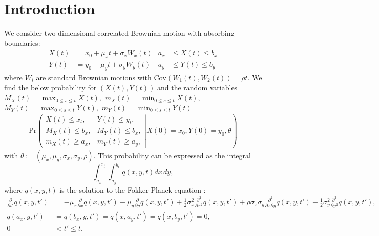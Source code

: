 \label{ch:galerkin}

\section{Introduction}

We consider two-dimensional correlated Brownian motion with absorbing boundaries:
\begin{align}
  X(t) &= x_0 + \mu_x t + \sigma_x W_x(t) &a_x &\leq X(t) \leq b_x   \label{eq:X} \\
  Y(t) &= y_0 + \mu_y t + \sigma_y W_y(t) &a_y &\leq Y(t) \leq b_y   \label{eq:Y} 
\end{align}
where $W_i$ are standard Brownian motions with
$\mbox{Cov}(W_1(t), W_2(t)) = \rho t$. We find the below probability
for $(X(t), Y(t))$ and the random variables
$M_X(t)=\max_{0\leq s\leq t}X(t),$ $m_X(t)=\min_{0\leq s\leq t}X(t),$
$M_Y(t)=\max_{0\leq s\leq t}Y(t),$ $m_Y(t)=\min_{0\leq s\leq t}Y(t)$
\begin{align}
  \mbox{Pr}\left( \left. \begin{array}{ll}
                           X(t) \leq x_t, & Y(t) \leq y_t, \\
                           M_X(t) \leq b_x, & M_Y(t) \leq b_x, \\
                           m_X(t) \geq a_x, & m_Y(t) \geq a_y,
                         \end{array} \right| X(0) = x_0, Y(0) = y_0, \theta \right)
                                              \label{eq:CDF}
\end{align}
with $\theta := (\mu_x, \mu_y, \sigma_x, \sigma_y, \rho).$ This
probability can be expressed as the integral
\[
  \displaystyle \int_{a_x}^{x_t} \displaystyle \int_{a_y}^{y_t} q(x,y,t) dx\,dy,
\]
where $q(x,y,t)$ is the solution to the Fokker-Planck equation
\cite{oksendal2013stochastic}:
\begin{align}
  \displaystyle \frac{\partial}{\partial t'} q(x,y,t') &= -\mu_x \frac{\partial}{\partial x}q(x,y,t')
                                         - \mu_y \frac{\partial}{\partial y}q(x,y,t')
                                         + \frac{1}{2}\sigma_x^2 \frac{\partial^2}{\partial x^2}q(x,y,t')
                                         + \rho\sigma_x\sigma_y \frac{\partial^2}{\partial x \partial y}q(x,y,t')
                                         + \frac{1}{2}\sigma_y^2 \frac{\partial^2}{\partial y^2}q(x,y,t'),
  \label{eq:1} \\
  q(a_x, y,t') &= q(b_x,y,t') = q(x,a_y,t') = q(x,b_y,t') = 0, \label{eq:2} \\
   0 &< t' \leq t. \nonumber
\end{align}
